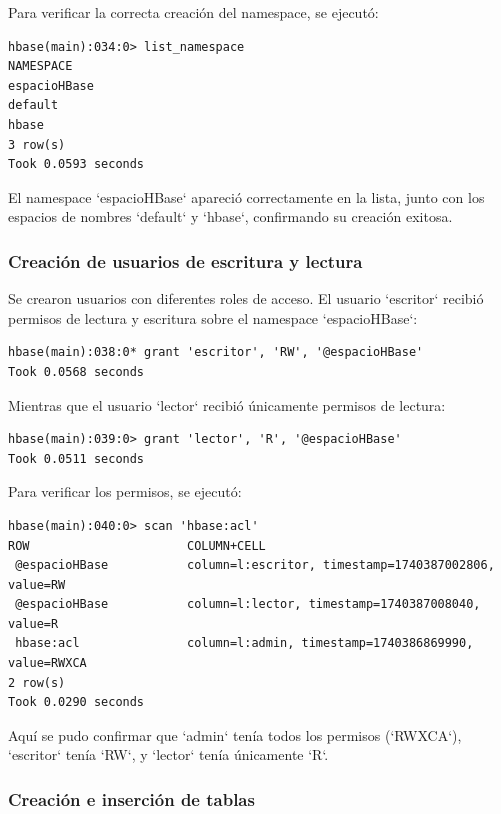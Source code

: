 \documentclass{article}
\begin{document}
Para verificar la correcta creación del namespace, se ejecutó:

\begin{lstlisting}[style=bashStyle]
hbase(main):034:0> list_namespace
NAMESPACE
espacioHBase
default
hbase
3 row(s)
Took 0.0593 seconds
\end{lstlisting}

El namespace `espacioHBase` apareció correctamente en la lista, junto con los espacios de nombres `default` y `hbase`, confirmando su creación exitosa.


\subsubsection{Creación de usuarios de escritura y lectura}

Se crearon usuarios con diferentes roles de acceso. El usuario `escritor` recibió permisos de lectura y escritura sobre el namespace `espacioHBase`:

\begin{lstlisting}[style=bashStyle]
hbase(main):038:0* grant 'escritor', 'RW', '@espacioHBase'
Took 0.0568 seconds
\end{lstlisting}

Mientras que el usuario `lector` recibió únicamente permisos de lectura:

\begin{lstlisting}[style=bashStyle]
hbase(main):039:0> grant 'lector', 'R', '@espacioHBase'
Took 0.0511 seconds
\end{lstlisting}

Para verificar los permisos, se ejecutó:

\begin{lstlisting}[style=bashStyle]
hbase(main):040:0> scan 'hbase:acl'
ROW                      COLUMN+CELL
 @espacioHBase           column=l:escritor, timestamp=1740387002806, value=RW
 @espacioHBase           column=l:lector, timestamp=1740387008040, value=R
 hbase:acl               column=l:admin, timestamp=1740386869990, value=RWXCA
2 row(s)
Took 0.0290 seconds
\end{lstlisting}

Aquí se pudo confirmar que `admin` tenía todos los permisos (`RWXCA`), `escritor` tenía `RW`, y `lector` tenía únicamente `R`.


\subsubsection{Creación e inserción de tablas}
\end{document}
